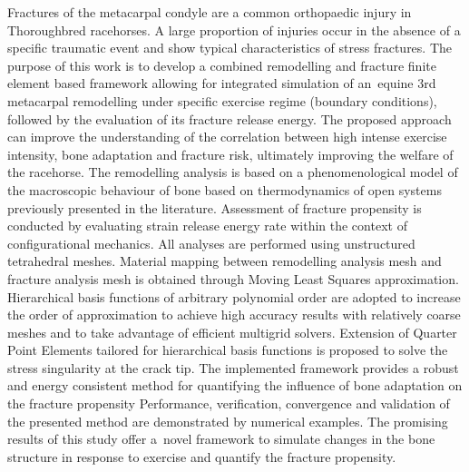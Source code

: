 \documentclass[11pt]{acmeArticle}
\numberwithin{equation}{section}
\begin{document}
{\small 
	Fractures of the metacarpal condyle are a common orthopaedic injury in Thoroughbred racehorses.  
	A large proportion of injuries occur in the absence of a specific traumatic event and show typical characteristics of stress fractures. 
	The purpose of this work is to develop a combined remodelling and fracture finite element based framework allowing for integrated simulation of an~equine 3rd metacarpal remodelling under specific exercise regime (boundary conditions), followed by the evaluation of its fracture release energy. 
	The proposed approach can improve the understanding of the correlation between high intense exercise intensity, bone adaptation and fracture 
	risk, ultimately improving the welfare of the racehorse. 
	The remodelling analysis is based on a phenomenological model of the macroscopic behaviour of bone based on thermodynamics of open 
	systems previously presented in the literature. 
	Assessment of fracture propensity is conducted by evaluating strain release energy rate within the context of configurational mechanics. 
	All analyses are performed using unstructured tetrahedral meshes. 
	Material mapping between remodelling analysis mesh and fracture analysis mesh is obtained through Moving Least Squares approximation. 
	Hierarchical basis functions of arbitrary polynomial order are adopted to increase the order of approximation to achieve high 
	accuracy results with relatively coarse meshes and to take advantage of efficient multigrid solvers.
	Extension of Quarter Point Elements tailored for hierarchical basis functions is proposed to solve the stress singularity at the 
	crack tip.
	The implemented framework provides a robust and energy consistent method for quantifying the influence of bone adaptation on the
	 fracture propensity
	Performance, verification, convergence and validation of the presented method are demonstrated by numerical examples.
	The promising results of this study offer a~novel framework to simulate changes in the bone structure in response to exercise and 
	quantify the fracture propensity.
	 
	
}
\end{document}
